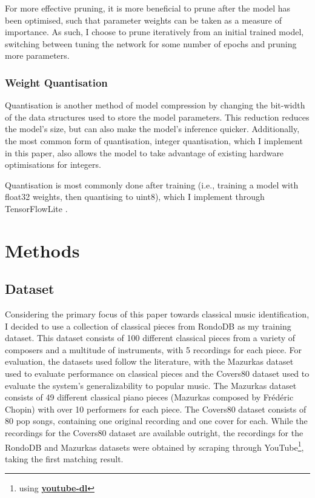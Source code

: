 \documentclass{article}
\begin{document}
For more effective pruning, it is more beneficial to prune after the model has been optimised, such that parameter weights can be taken as a measure of importance. As such, I choose to prune iteratively from an initial trained model, switching between tuning the network for some number of epochs and pruning more parameters.

\subsubsection{Weight Quantisation}\label{sec:quantization}
Quantisation is another method of model compression by changing the bit-width of the data structures used to store the model parameters. This reduction reduces the model's size, but can also make the model's inference quicker. Additionally, the most common form of quantisation, integer quantisation, which I implement in this paper, also allows the model to take advantage of existing hardware optimisations for integers.

Quantisation is most commonly done after training (i.e., training a model with float32 weights, then quantising to uint8), which I implement through TensorFlowLite \cite{Demosthenous2021}.

\section{Methods}\label{sec:methods}
\subsection{Dataset}\label{sec:dataset}
Considering the primary focus of this paper towards classical music identification, I decided to use a collection of classical pieces from RondoDB \cite{RondoDB} as my training dataset. This dataset consists of 100 different classical pieces from a variety of composers and a multitude of instruments, with 5 recordings for each piece. For evaluation, the datasets used follow the literature, with the Mazurkas dataset \cite{MazurkaProject} used to evaluate performance on classical pieces and the Covers80 \cite{Covers80} dataset used to evaluate the system's generalizability to popular music. The Mazurkas dataset consists of 49 different classical piano pieces (Mazurkas composed by Frédéric Chopin) with over 10 performers for each piece. The Covers80 dataset consists of 80 pop songs, containing one original recording and one cover for each. While the recordings for the Covers80 dataset are available outright, the recordings for the RondoDB and Mazurkas datasets were obtained by scraping through YouTube\footnote{using \href{https://github.com/ytdl-org/youtube-dl}{\textbf{youtube-dl}}}, taking the first matching result.
\end{document}
